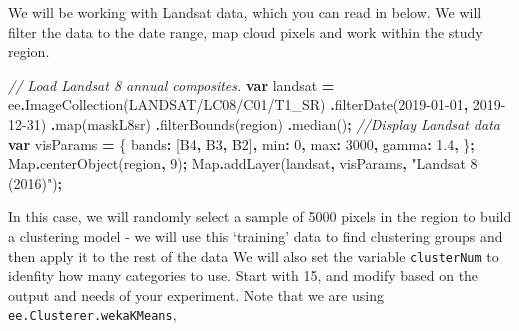 \documentclass[
]{article}
\newenvironment{Shaded}{\begin{snugshade}}{\end{snugshade}}
\newcommand{\BuiltInTok}[1]{#1}
\newcommand{\CommentTok}[1]{\textcolor[rgb]{0.56,0.35,0.01}{\textit{#1}}}
\newcommand{\DataTypeTok}[1]{\textcolor[rgb]{0.13,0.29,0.53}{#1}}
\newcommand{\DecValTok}[1]{\textcolor[rgb]{0.00,0.00,0.81}{#1}}
\newcommand{\FloatTok}[1]{\textcolor[rgb]{0.00,0.00,0.81}{#1}}
\newcommand{\FunctionTok}[1]{\textcolor[rgb]{0.00,0.00,0.00}{#1}}
\newcommand{\KeywordTok}[1]{\textcolor[rgb]{0.13,0.29,0.53}{\textbf{#1}}}
\newcommand{\NormalTok}[1]{#1}
\newcommand{\OperatorTok}[1]{\textcolor[rgb]{0.81,0.36,0.00}{\textbf{#1}}}
\newcommand{\StringTok}[1]{\textcolor[rgb]{0.31,0.60,0.02}{#1}}
\begin{document}
We will be working with Landsat data, which you can read in below. We will filter the data to the date range, map cloud pixels and work within the study region.

\begin{Shaded}
\begin{Highlighting}[]
\CommentTok{// Load Landsat 8 annual composites.}
\KeywordTok{var}\NormalTok{ landsat }\OperatorTok{=}\NormalTok{ ee}\OperatorTok{.}\FunctionTok{ImageCollection}\NormalTok{(}\StringTok{\textquotesingle{}LANDSAT/LC08/C01/T1\_SR\textquotesingle{}}\NormalTok{)}
      \OperatorTok{.}\FunctionTok{filterDate}\NormalTok{(}\StringTok{\textquotesingle{}2019{-}01{-}01\textquotesingle{}}\OperatorTok{,} \StringTok{\textquotesingle{}2019{-}12{-}31\textquotesingle{}}\NormalTok{)}
      \OperatorTok{.}\FunctionTok{map}\NormalTok{(maskL8sr)}
      \OperatorTok{.}\FunctionTok{filterBounds}\NormalTok{(region)}
      \OperatorTok{.}\FunctionTok{median}\NormalTok{()}\OperatorTok{;}
\CommentTok{//Display Landsat data}
\KeywordTok{var}\NormalTok{ visParams }\OperatorTok{=}\NormalTok{ \{}
       \DataTypeTok{bands}\OperatorTok{:}\NormalTok{ [}\StringTok{\textquotesingle{}B4\textquotesingle{}}\OperatorTok{,} \StringTok{\textquotesingle{}B3\textquotesingle{}}\OperatorTok{,} \StringTok{\textquotesingle{}B2\textquotesingle{}}\NormalTok{]}\OperatorTok{,}
       \DataTypeTok{min}\OperatorTok{:} \DecValTok{0}\OperatorTok{,}
       \DataTypeTok{max}\OperatorTok{:} \DecValTok{3000}\OperatorTok{,}
       \DataTypeTok{gamma}\OperatorTok{:} \FloatTok{1.4}\OperatorTok{,}
\NormalTok{\}}\OperatorTok{;}
\BuiltInTok{Map}\OperatorTok{.}\FunctionTok{centerObject}\NormalTok{(region}\OperatorTok{,} \DecValTok{9}\NormalTok{)}\OperatorTok{;}
\BuiltInTok{Map}\OperatorTok{.}\FunctionTok{addLayer}\NormalTok{(landsat}\OperatorTok{,}\NormalTok{ visParams}\OperatorTok{,} \StringTok{"Landsat 8 (2016)"}\NormalTok{)}\OperatorTok{;}
\end{Highlighting}
\end{Shaded}

In this case, we will randomly select a sample of 5000 pixels in the region to build a clustering model - we will use this `training' data to find clustering groups and then apply it to the rest of the data We will also set the variable \texttt{clusterNum} to idenfity how many categories to use. Start with 15, and modify based on the output and needs of your experiment. Note that we are using \texttt{ee.Clusterer.wekaKMeans},
\end{document}
